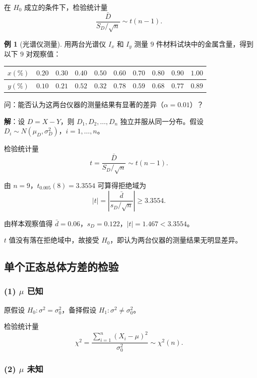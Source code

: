 \documentclass[11pt,a4paper]{report}
\theoremstyle{definition}
\newtheorem{example}{例}[chapter]
\begin{document}
在 $H_{0}$ 成立的条件下，检验统计量
\[
\frac{\bar{D}}{S_{D}/\sqrt{n}}\sim t(n-1).
\]

\begin{example}[光谱仪测量]
用两台光谱仪 $I_{x}$ 和 $I_{y}$ 测量 $9$ 件材料试块中的金属含量，得到以下 $9$ 对观察值：

\begin{table}[htbp]
\centering
\begin{tabular}{@{}cccccccccc@{}}
\toprule
$x(\%)$ & $0.20$ & $0.30$ & $0.40$ & $0.50$ & $0.60$ & $0.70$ & $0.80$ & $0.90$ & $1.00$ \\
\midrule
$y(\%)$ & $0.10$ & $0.21$ & $0.52$ & $0.32$ & $0.78$ & $0.59$ & $0.68$ & $0.77$ & $0.89$ \\
\bottomrule
\end{tabular}
\end{table}

问：能否认为这两台仪器的测量结果有显著的差异（$\alpha=0.01$）？

\textbf{解}：设 $D=X-Y$，则 $D_{1},D_{2},\ldots,D_{n}$ 独立并服从同一分布。假设 $D_{i}\sim N(\mu_{D},\sigma_{D}^{2})$，$i=1,\ldots,n$。

检验统计量
\[
t=\frac{\bar{D}}{S_{D}/\sqrt{n}}\sim t(n-1).
\]

由 $n=9$，$t_{0.005}(8)=3.3554$ 可算得拒绝域为
\[
|t|=\left|\frac{\bar{d}}{s_{D}/\sqrt{n}}\right|\geq 3.3554.
\]

由样本观察值得 $\bar{d}=0.06$，$s_{D}=0.122$，$|t|=1.467<3.3554$。

$t$ 值没有落在拒绝域中，故接受 $H_{0}$，即认为两台仪器的测量结果无明显差异。
\end{example}

\subsection{单个正态总体方差的检验}

\subsubsection*{(1) $\mu$ 已知}

原假设 $H_{0}\colon\sigma^{2}=\sigma_{0}^{2}$，备择假设 $H_{1}\colon\sigma^{2}\neq\sigma_{0}^{2}$。

检验统计量
\[
\chi^{2}=\frac{\sum_{i=1}^{n}(X_{i}-\mu)^{2}}{\sigma_{0}^{2}}\sim\chi^{2}(n).
\]

\subsubsection*{(2) $\mu$ 未知}
\end{document}
